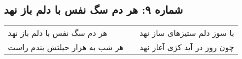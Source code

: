 \begin{center}
\section*{شماره ۹: هر دم سگ نفس با دلم باز نهد}
\label{sec:009}
\begin{longtable}{l p{0.5cm} r}
هر دم سگ نفس با دلم باز نهد
&&
با سوز دلم ستیزهای ساز نهد
\\
هر شب به هزار حیلتش بندم راست
&&
چون روز در آید کژی آغاز نهد
\\
\end{longtable}
\end{center}
